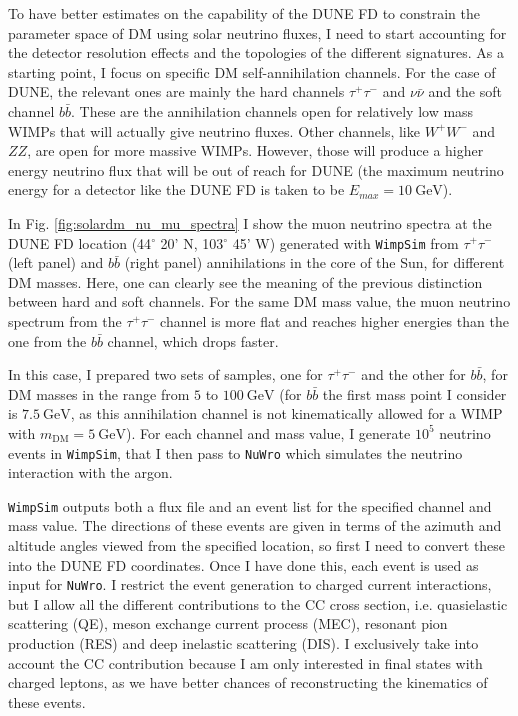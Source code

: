 To have better estimates on the capability of the DUNE FD to constrain the parameter space of DM using solar neutrino fluxes, I need to start accounting for the detector resolution effects and the topologies of the different signatures. As a starting point, I focus on specific DM self-annihilation channels. For the case of DUNE, the relevant ones are mainly the hard channels $\tau^{+} \tau^{-}$ and $\nu \bar{\nu}$ and the soft channel $b\bar{b}$. These are the annihilation channels open for relatively low mass WIMPs that will actually give neutrino fluxes. Other channels, like $W^{+} W^{-}$ and $ZZ$, are open for more massive WIMPs. However, those will produce a higher energy neutrino flux that will be out of reach for DUNE (the maximum neutrino energy for a detector like the DUNE FD is taken to be $E_{max} = 10 \ \mathrm{GeV}$).

In Fig. \ref{fig:solardm_nu_mu_spectra} I show the muon neutrino spectra at the DUNE FD location (44$^{\circ} $ 20' N, 103$^{\circ} $ 45' W) generated with \texttt{WimpSim} from $\tau^{+} \tau^{-}$ (left panel) and $b\bar{b}$ (right panel) annihilations in the core of the Sun, for different DM masses. Here, one can clearly see the meaning of the previous distinction between hard and soft channels. For the same DM mass value, the muon neutrino spectrum from the $\tau^{+} \tau^{-}$ channel is more flat and reaches higher energies than the one from the $b\bar{b}$ channel, which drops faster.

In this case, I prepared two sets of samples, one for $\tau^{+} \tau^{-}$ and the other for $b\bar{b}$, for DM masses in the range from $5$ to $100 \ \mathrm{GeV}$ (for $b\bar{b}$ the first mass point I consider is $7.5 \ \mathrm{GeV}$, as this annihilation channel is not kinematically allowed for a WIMP with $m_{\mathrm{DM}}=5 \ \mathrm{GeV}$). For each channel and mass value, I generate $10^{5}$ neutrino events in \texttt{WimpSim}, that I then pass to \texttt{NuWro} which simulates the neutrino interaction with the argon.

\texttt{WimpSim} outputs both a flux file and an event list for the specified channel and mass value. The directions of these events are given in terms of the azimuth and altitude angles viewed from the specified location, so first I need to convert these into the DUNE FD coordinates. Once I have done this, each event is used as input for \texttt{NuWro}. I restrict the event generation to charged current interactions, but I allow all the different contributions to the CC cross section, i.e. quasielastic scattering (QE), meson exchange current process (MEC), resonant pion production (RES) and deep inelastic scattering (DIS). I exclusively take into account the CC contribution because I am only interested in final states with charged leptons, as we have better chances of reconstructing the kinematics of these events.

